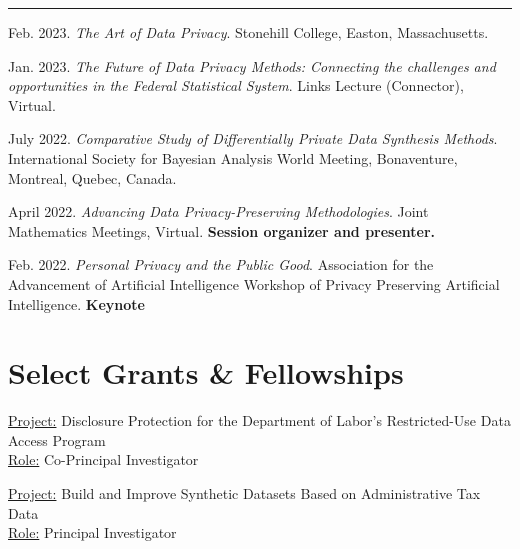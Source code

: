 \documentclass[11pt, letterpaper, roman]{moderncv} %
\begin{document}
\rule{\textwidth}{0.1pt}
\begin{etaremune}[topsep=0pt, itemsep=4pt, partopsep=0pt, parsep=0pt]
\smallskip
    
    \item Feb. 2023. \textit{The Art of Data Privacy}. Stonehill College, Easton, Massachusetts.
    
    \item Jan. 2023. \textit{The Future of Data Privacy Methods: Connecting the challenges and opportunities in the Federal Statistical System}. Links Lecture (Connector), Virtual.

    \item July 2022. \textit{Comparative Study of Differentially Private Data Synthesis Methods}. International Society for Bayesian Analysis World Meeting, Bonaventure, Montreal, Quebec, Canada.

    \item April 2022. \textit{Advancing Data Privacy-Preserving Methodologies}. Joint Mathematics Meetings, Virtual. \textbf{Session organizer and presenter.}
    
    \item Feb. 2022. \textit{Personal Privacy and the Public Good}. Association for the Advancement of Artificial Intelligence Workshop of Privacy Preserving Artificial Intelligence. \textbf{Keynote}
  
\end{etaremune}

\section{Select Grants \&  Fellowships}

    { 
        \underline{Project:} Disclosure Protection for the Department of Labor's Restricted-Use Data Access Program\\
        \underline{Role:} Co-Principal Investigator
    }

    \vspace{4pt}
    { 
        \underline{Project:} Build and Improve Synthetic Datasets Based on Administrative Tax Data\\
        \underline{Role:} Principal Investigator
    }
\end{document}
